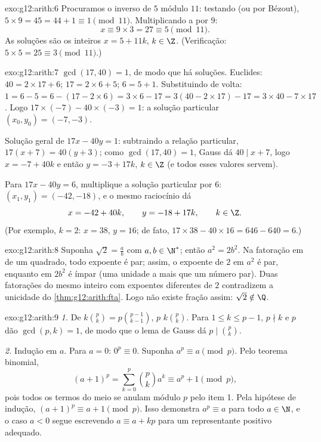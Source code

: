 \begin{solution}{exo:g12:arith:6}
Procuramos o inverso de $5$ módulo $11$: testando (ou por Bézout),
$5 \times 9 = 45 = 44 + 1 \equiv 1 \pmod{11}$. Multiplicando a 
por $9$:
\[
x \equiv 9 \times 3 = 27 \equiv 5 \pmod{11}.
\]
As soluções são os inteiros $x = 5 + 11k$, $k \in \Z$. (Verificação:
$5\times5 = 25 \equiv 3 \pmod{11}$.)
\end{solution}

\begin{solution}{exo:g12:arith:7}
$\gcd(17, 40) = 1$, de modo que há soluções. Euclides:
$40 = 2\times17 + 6$; $17 = 2\times6 + 5$; $6 = 5 + 1$. Substituindo de
volta: $1 = 6 - 5 = 6 - (17 - 2\times6) = 3\times6 - 17
= 3(40 - 2\times17) - 17 = 3\times40 - 7\times17$. Logo
$17\times(-7) - 40\times(-3) = 1$: a solução particular
$(x_0, y_0) = (-7, -3)$.

Solução geral de $17x - 40y = 1$: subtraindo a relação particular,
$17(x + 7) = 40(y + 3)$; como $\gcd(17, 40) = 1$, Gauss dá
$40 \mid x + 7$, logo $x = -7 + 40k$ e então $y = -3 + 17k$, $k \in \Z$
(e todos esses valores servem).

Para $17x - 40y = 6$, multiplique a solução particular por $6$:
$(x_1, y_1) = (-42, -18)$, e o mesmo raciocínio dá
\[
x = -42 + 40k, \qquad y = -18 + 17k, \qquad k \in \Z .
\]
(Por exemplo, $k = 2$: $x = 38$, $y = 16$; de fato,
$17\times38 - 40\times16 = 646 - 640 = 6$.)
\end{solution}

\begin{solution}{exo:g12:arith:8}
Suponha $\sqrt2 = \frac ab$ com $a, b \in \N^*$; então $a^2 = 2b^2$. Na
fatoração em  de um quadrado, todo expoente é par; assim, o expoente
de $2$ em $a^2$ é par, enquanto em $2b^2$ é ímpar (uma unidade a mais que
um número par). Duas fatorações do mesmo inteiro com expoentes diferentes
de $2$ contradizem a unicidade do \cref{thm:g12:arith:fta}. Logo não
existe fração assim: $\sqrt2 \notin \Q$.
\end{solution}

\begin{solution}{exo:g12:arith:9}
\emph{1.} De $k\binom pk = p \binom{p-1}{k-1}$, $p$ 
$k\binom pk$. Para $1 \leq k \leq p-1$, $p \nmid k$ e $p$  dão
$\gcd(p, k) = 1$, de modo que o lema de Gauss dá $p \mid \binom pk$.

\emph{2.} Indução em $a$. Para $a = 0$: $0^p \equiv 0$. Suponha
$a^p \equiv a \pmod p$. Pelo teorema binomial,
\[
(a+1)^p = \sum_{k=0}^{p} \binom pk a^k
\equiv a^p + 1 \pmod p,
\]
pois todos os termos do meio se anulam módulo $p$ pelo item 1. Pela
hipótese de indução, $(a+1)^p \equiv a + 1 \pmod p$. Isso demonstra
$a^p \equiv a$ para todo $a \in \N$, e o caso $a < 0$ segue escrevendo
$a \equiv a + kp$ para um representante positivo adequado.
\end{solution}

